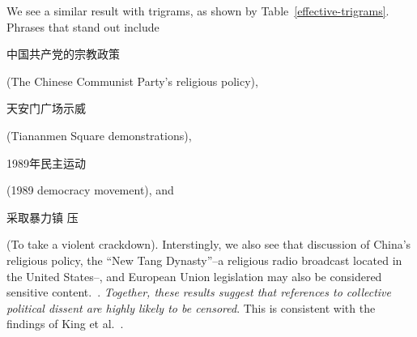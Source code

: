 We see a similar result with trigrams, as shown by
Table~\ref{effective-trigrams}. Phrases that stand out
include \begin{CJK*}{UTF8}{gbsn}中国共产党的宗教政策\end{CJK*} (The
Chinese Communist Party's religious policy), \begin{CJK*}{UTF8}{gbsn}
天安门广场示威\end{CJK*} (Tiananmen Square
demonstrations), \begin{CJK*}{UTF8}{gbsn}1989年民主运动\end{CJK*}
(1989 democracy movement), and \begin{CJK*}{UTF8}{gbsn}采取暴力镇
压\end{CJK*} (To take a violent crackdown). Interstingly, we also see
that discussion of China's religious policy, the ``New Tang
Dynasty''--a religious radio broadcast located in the United States--,
and European Union legislation may also be considered sensitive
content.~\cite{china-religion}. \textit{Together, these results
suggest that references to collective political dissent are highly
likely to be censored}. This is consistent with the findings of King
et al.~\cite{king2013censorship}.
